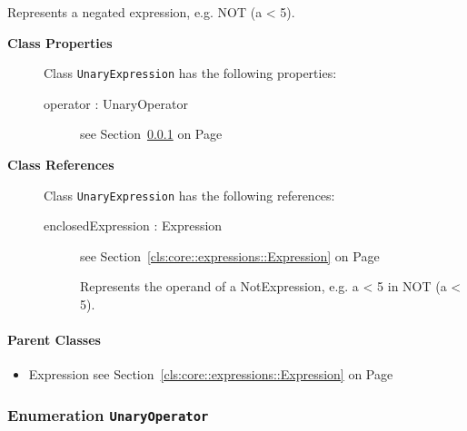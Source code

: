	
			
Represents a negated expression, e.g. NOT (a < 5).	
		
	


\begin{description}

	\item[\textbf{Class Properties}] Class \texttt{UnaryExpression} has the following properties:
	\begin{description}
\item[operator : UnaryOperator 	]
see Section~\ref{cls:core::expressions::common::UnaryOperator} on Page~\pageref{cls:core::expressions::common::UnaryOperator}
\hspace{\fill}
\nopagebreak


	
	\end{description}
	
	\item[\textbf{Class References}] Class \texttt{UnaryExpression} has the following references:
	\begin{description}
\item[enclosedExpression : Expression 	]
see Section~\ref{cls:core::expressions::Expression} on Page~\pageref{cls:core::expressions::Expression}
\hspace{\fill}
\nopagebreak


	
			
Represents the operand of a NotExpression, e.g. a < 5 in NOT (a < 5).	
		
	
	\end{description}
	

\end{description}

\paragraph{Parent Classes}
\begin{itemize}
\item Expression see Section~\ref{cls:core::expressions::Expression} on Page~\pageref{cls:core::expressions::Expression}\end{itemize}
\subsubsection{\Large{Enumeration \bfseries \texttt{UnaryOperator}\normalfont}}
\label{cls:core::expressions::common::UnaryOperator} 

